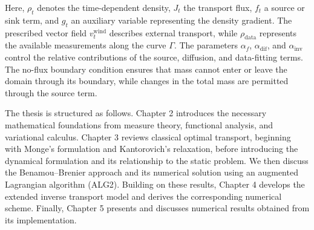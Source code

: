 Here, \(\rho_t\) denotes the time-dependent density, \(J_t\) the transport flux, \(f_t\) a source or sink term, and \(g_t\) an auxiliary variable representing the density gradient. The prescribed vector field \(v_t^{\mathrm{wind}}\) describes external transport, while \(\rho_{\mathrm{data}}\) represents the available measurements along the curve \(\Gamma\). The parameters \(\alpha_f\), \(\alpha_{\mathrm{dif}}\), and \(\alpha_{\mathrm{inv}}\) control the relative contributions of the source, diffusion, and data-fitting terms. The no-flux boundary condition ensures that mass cannot enter or leave the domain through its boundary, while changes in the total mass are permitted through the source term.

The thesis is structured as follows. Chapter 2 introduces the necessary mathematical foundations from measure theory, functional analysis, and variational calculus. Chapter 3 reviews classical optimal transport, beginning with Monge's formulation and Kantorovich's relaxation, before introducing the dynamical formulation and its relationship to the static problem. We then discuss the Benamou–Brenier approach and its numerical solution using an augmented Lagrangian algorithm (ALG2). Building on these results, Chapter 4 develops the extended inverse transport model and derives the corresponding numerical scheme. Finally, Chapter 5 presents and discusses numerical results obtained from its implementation.
\newpage
